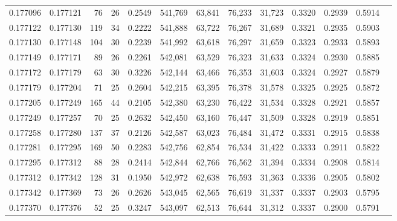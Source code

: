 \begin{tabular}{rrrrrrrrrrrrr}
0.177096 & 0.177121 &  76 &  26 &                                     0.2549 & 541,769 &  63,841 &  76,233 &  31,723 & 0.3320 & 0.2939 & 0.5914 \\
0.177122 & 0.177130 & 119 &  34 &                                     0.2222 & 541,888 &  63,722 &  76,267 &  31,689 & 0.3321 & 0.2935 & 0.5903 \\
0.177130 & 0.177148 & 104 &  30 &                                     0.2239 & 541,992 &  63,618 &  76,297 &  31,659 & 0.3323 & 0.2933 & 0.5893 \\
0.177149 & 0.177171 &  89 &  26 &                                     0.2261 & 542,081 &  63,529 &  76,323 &  31,633 & 0.3324 & 0.2930 & 0.5885 \\
0.177172 & 0.177179 &  63 &  30 &                                     0.3226 & 542,144 &  63,466 &  76,353 &  31,603 & 0.3324 & 0.2927 & 0.5879 \\
0.177179 & 0.177204 &  71 &  25 &                                     0.2604 & 542,215 &  63,395 &  76,378 &  31,578 & 0.3325 & 0.2925 & 0.5872 \\
0.177205 & 0.177249 & 165 &  44 &                                     0.2105 & 542,380 &  63,230 &  76,422 &  31,534 & 0.3328 & 0.2921 & 0.5857 \\
0.177249 & 0.177257 &  70 &  25 &                                     0.2632 & 542,450 &  63,160 &  76,447 &  31,509 & 0.3328 & 0.2919 & 0.5851 \\
0.177258 & 0.177280 & 137 &  37 &                                     0.2126 & 542,587 &  63,023 &  76,484 &  31,472 & 0.3331 & 0.2915 & 0.5838 \\
0.177281 & 0.177295 & 169 &  50 &                                     0.2283 & 542,756 &  62,854 &  76,534 &  31,422 & 0.3333 & 0.2911 & 0.5822 \\
0.177295 & 0.177312 &  88 &  28 &                                     0.2414 & 542,844 &  62,766 &  76,562 &  31,394 & 0.3334 & 0.2908 & 0.5814 \\
0.177312 & 0.177342 & 128 &  31 &                                     0.1950 & 542,972 &  62,638 &  76,593 &  31,363 & 0.3336 & 0.2905 & 0.5802 \\
0.177342 & 0.177369 &  73 &  26 &                                     0.2626 & 543,045 &  62,565 &  76,619 &  31,337 & 0.3337 & 0.2903 & 0.5795 \\
0.177370 & 0.177376 &  52 &  25 &                                     0.3247 & 543,097 &  62,513 &  76,644 &  31,312 & 0.3337 & 0.2900 & 0.5791 \\

\end{tabular}
